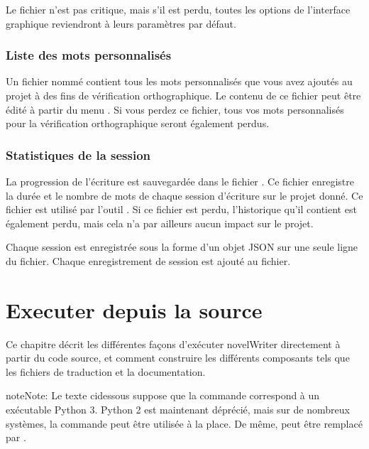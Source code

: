 \documentclass[a4paper,11pt,french]{sphinxmanual}
\begin{document}
\sphinxAtStartPar
Le fichier n’est pas critique, mais s’il est perdu, toutes les options de l’interface graphique reviendront à leurs paramètres par défaut.


\subsection{Liste des mots personnalisés}
\label{\detokenize{tech_storage:custom-word-list}}
\sphinxAtStartPar
Un fichier nommé  contient tous les mots personnalisés que vous avez ajoutés au projet à des fins de vérification orthographique. Le contenu de ce fichier peut être édité à partir du menu . Si vous perdez ce fichier, tous vos mots personnalisés pour la vérification orthographique seront également perdus.


\subsection{Statistiques de la session}
\label{\detokenize{tech_storage:session-stats}}
\sphinxAtStartPar
La progression de l’écriture est sauvegardée dans le fichier . Ce fichier enregistre la durée et le nombre de mots de chaque session d’écriture sur le projet donné. Ce fichier est utilisé par l’outil . Si ce fichier est perdu, l’historique qu’il contient est également perdu, mais cela n’a par ailleurs aucun impact sur le projet.

\sphinxAtStartPar
Chaque session est enregistrée sous la forme d’un objet JSON sur une seule ligne du fichier. Chaque enregistrement de session est ajouté au fichier.

\sphinxstepscope


\chapter{Executer depuis la source}
\label{\detokenize{tech_source:running-from-source}}\label{\detokenize{tech_source:a-source}}\label{\detokenize{tech_source::doc}}
\sphinxAtStartPar
Ce chapitre décrit les différentes façons d’exécuter novelWriter directement à partir du code source, et comment construire les différents composants tels que les fichiers de traduction et la documentation.

\begin{sphinxadmonition}{note}{Note:}
\sphinxAtStartPar
Le texte ci\sphinxhyphen{}dessous suppose que la commande  correspond à un exécutable Python 3. Python 2 est maintenant déprécié, mais sur de nombreux systèmes, la commande  peut être utilisée à la place. De même,  peut être remplacé par .
\end{sphinxadmonition}
\end{document}
